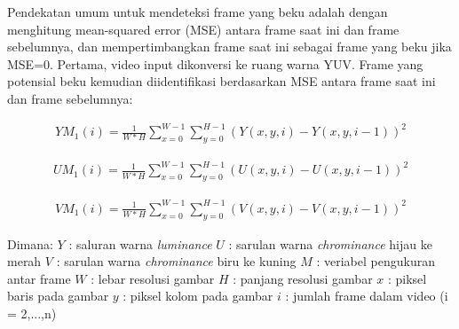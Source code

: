 Pendekatan umum untuk mendeteksi frame yang beku adalah dengan menghitung mean-squared error (MSE) antara frame saat ini dan frame sebelumnya, dan mempertimbangkan frame saat ini sebagai frame yang beku jika MSE=0. Pertama, video input dikonversi ke ruang warna YUV. Frame yang potensial beku kemudian diidentifikasi berdasarkan MSE antara frame saat ini dan frame sebelumnya:

\begin{equation}
	\begin{aligned}
		YM_{1}(i)=\frac{1}{W*H}\sum_{x=0}^{W-1}\sum_{y=0}^{H-1}(Y(x,y,i)-Y(x,y,i-1))^{2}
	\end{aligned}
\end{equation}

\begin{equation}
	\begin{aligned}
		UM_{1}(i)=\frac{1}{W*H}\sum_{x=0}^{W-1}\sum_{y=0}^{H-1}(U(x,y,i)-U(x,y,i-1))^{2}
	\end{aligned}
\end{equation}

\begin{equation}
	\begin{aligned}
		VM_{1}(i)=\frac{1}{W*H}\sum_{x=0}^{W-1}\sum_{y=0}^{H-1}(V(x,y,i)-V(x,y,i-1))^{2}
	\end{aligned}
\end{equation}

Dimana:
\newline
$Y$ 	\hspace{0.4cm}: saluran warna \textit{luminance}\newline
$U$ 	\hspace{0.4cm}: sarulan warna \textit{chrominance} hijau ke merah \newline
$V$ 	\hspace{0.4cm}: sarulan warna \textit{chrominance} biru ke kuning \newline
$M$ 	\hspace{0.3cm}: veriabel pengukuran antar frame \newline
$W$ 	\hspace{0.3cm}: lebar resolusi gambar \newline
$H$ 	\hspace{0.4cm}: panjang resolusi gambar \newline
$x$ 	\hspace{0.5cm}: piksel baris pada gambar \newline
$y$ 	\hspace{0.4cm}: piksel kolom pada gambar\newline
$i$ 	\hspace{0.5cm}: jumlah frame dalam video (i = 2,...,n) \newline

